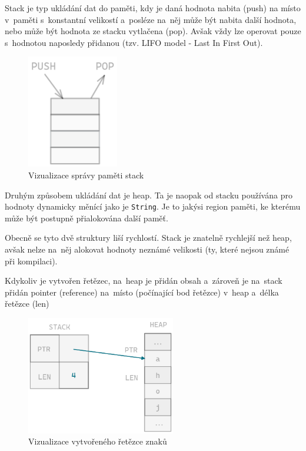 \documentclass[a4paper, 12pt, twoside]{article} %
\begin{document}
				Stack je typ ukládání dat do paměti, kdy je daná hodnota nabita (push) na místo v~paměti s~konstantní velikostí  a~posléze na~něj může být nabita další hodnota, nebo může být hodnota ze stacku vytlačena (pop). Avšak vždy lze operovat pouze s~hodnotou naposledy přidanou (tzv. LIFO model - Last In First Out).
				\begin{center}
					\begin{figure}[H]
						\centering
						\includegraphics[width=4cm]{stack}
						\caption{Vizualizace správy paměti stack}
						\label{fig:my_label_2}
					\end{figure}
				\end{center}
	
				Druhým způsobem ukládání dat je heap. Ta je naopak od stacku používána pro hodnoty dynamicky měnící jako je \texttt{String}. Je to jakýsi region paměti, ke kterému může být postupně přialokována další paměť.
					
				Obecně se tyto dvě struktury liší rychlostí. Stack je znatelně rychlejší než heap, avšak nelze na~něj alokovat hodnoty neznámé velikosti (ty, které nejsou známé při kompilaci).
	
				Kdykoliv je vytvořen řetězec, na~heap je přidán obsah a~zároveň je na~stack přidán pointer (reference) na~místo (počínající bod řetězce) v~heap a~délka řetězce (len)
					
				\begin{center}
					\begin{figure}[H]
						\centering
						\includegraphics[width=6.5cm]{string_heap}
						\caption{Vizualizace vytvořeného řetězce znaků}
						\label{fig:my_label_3}
					\end{figure}
				\end{center}
					
\end{document}
